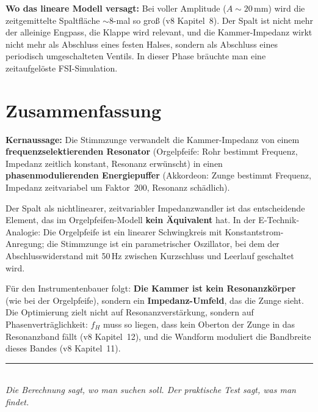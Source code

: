 \documentclass[11pt,a4paper]{article}
\begin{document}
\begin{warnbox}
\textbf{Wo das lineare Modell versagt:} Bei voller Amplitude ($A \sim 20$\,mm) wird die zeitgemittelte Spaltfläche $\sim$8-mal so groß (v8 Kapitel~8). Der Spalt ist nicht mehr der alleinige Engpass, die Klappe wird relevant, und die Kammer-Impedanz wirkt nicht mehr als Abschluss eines festen Halses, sondern als Abschluss eines periodisch umgeschalteten Ventils. In dieser Phase bräuchte man eine zeitaufgelöste FSI-Simulation.
\end{warnbox}

\section{Zusammenfassung}

\begin{keybox}
\textbf{Kernaussage:} Die Stimmzunge verwandelt die Kammer-Impedanz von einem \textbf{frequenzselektierenden Resonator} (Orgelpfeife: Rohr bestimmt Frequenz, Impedanz zeitlich konstant, Resonanz erwünscht) in einen \textbf{phasenmodulierenden Energiepuffer} (Akkordeon: Zunge bestimmt Frequenz, Impedanz zeitvariabel um Faktor~200, Resonanz schädlich).

Der Spalt als nichtlinearer, zeitvariabler Impedanzwandler ist das entscheidende Element, das im Orgelpfeifen-Modell \textbf{kein Äquivalent} hat. In der E-Technik-Analogie: Die Orgelpfeife ist ein linearer Schwingkreis mit Konstantstrom-Anregung; die Stimmzunge ist ein parametrischer Oszillator, bei dem der Abschlusswiderstand mit 50\,Hz zwischen Kurzschluss und Leerlauf geschaltet wird.

Für den Instrumentenbauer folgt: \textbf{Die Kammer ist kein Resonanzkörper} (wie bei der Orgelpfeife), sondern ein \textbf{Impedanz-Umfeld}, das die Zunge \glqq{}sieht\grqq{}. Die Optimierung zielt nicht auf Resonanzverstärkung, sondern auf Phasenverträglichkeit: $f_H$ muss so liegen, dass kein Oberton der Zunge in das Resonanzband fällt (v8 Kapitel~12), und die Wandform moduliert die Bandbreite dieses Bandes (v8 Kapitel~11).
\end{keybox}

\vspace{3mm}
\begin{center}
\textcolor{accentred}{\rule{0.6\textwidth}{1pt}}\\[4pt]
{\small\itshape Die Berechnung sagt, wo man suchen soll. Der praktische Test sagt, was man findet.}
\end{center}
\end{document}
